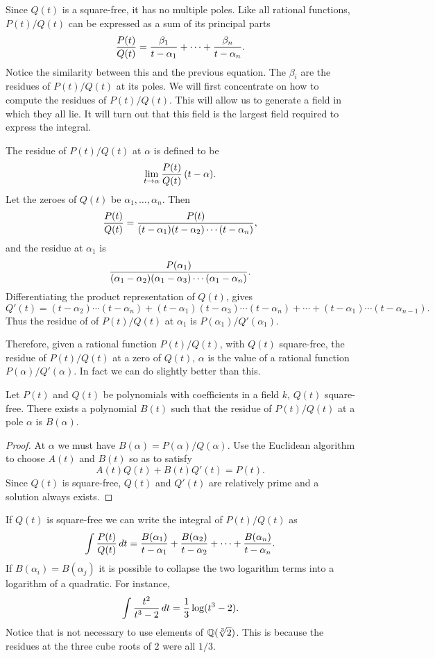 Since $Q(t)$ is a square-free, it has no multiple poles.  Like all rational
functions, $P(t)/Q(t)$ can be expressed as a sum of its principal parts
\[
{P(t) \over Q(t)} =
{\beta_1 \over t - \alpha_1} + \cdots + {\beta_n \over t - \alpha_n}.
\]
Notice the similarity between this and the previous equation.  The
$\beta_i$ are the residues of $P(t)/Q(t)$ at its poles.  We will first
concentrate on how to compute the residues of $P(t)/Q(t)$.  This will allow
us to generate a field in which they all lie.  It will turn out that this
field is the largest field required to express the integral.

The residue of $P(t)/Q(t)$ at $\alpha$ is defined to be
\[
\lim_{t \rightarrow \alpha} {P(t) \over Q(t)}\,(t - \alpha).
\]
Let the zeroes of $Q(t)$ be $\alpha_1, \ldots, \alpha_n$.  Then 
\[
{P(t) \over Q(t)} =
{P(t) \over (t - \alpha_1) (t - \alpha_2) \cdots (t - \alpha_n)},
\]
and the residue at $\alpha_1$ is
\[
{P(\alpha_1) \over (\alpha_1 - \alpha_2) (\alpha_1 - \alpha_3)
\cdots (\alpha_1 - \alpha_n)}.
\]
Differentiating the product representation of $Q(t)$, gives
\[
Q'(t) = (t - \alpha_2) \cdots (t - \alpha_n) +
(t - \alpha_1) (t - \alpha_3) \cdots (t - \alpha_n) + \cdots +
(t - \alpha_1) \cdots (t - \alpha_{n-1}).
\]
Thus the residue of of $P(t)/Q(t)$ at $\alpha_1$ is 
$P(\alpha_1)/Q'(\alpha_1)$.  

Therefore, given a rational function $P(t)/Q(t)$, with $Q(t)$ square-free,
the residue of $P(t)/Q(t)$ at a zero of $Q(t)$, $\alpha$ is the value of a
rational function $P(\alpha)/Q'(\alpha)$.  In fact we can do
slightly better than this.

\begin{proposition}
Let $P(t)$ and $Q(t)$ be polynomials with coefficients in a field $k$,
$Q(t)$ square-free.  There exists a polynomial $B(t)$ such that the
residue of $P(t)/Q(t)$ at a pole $\alpha$ is $B(\alpha)$.
\end{proposition}

\begin{proof}
At $\alpha$ we must have $B(\alpha) = P(\alpha) / Q(\alpha)$.  Use the
Euclidean algorithm to choose $A(t)$ and $B(t)$ so as to satisfy
\[
A(t) Q(t) + B(t) Q'(t) = P(t).
\]
Since $Q(t)$ is square-free, $Q(t)$ and $Q'(t)$ are relatively
prime and a solution always exists.
\end{proof}

If $Q(t)$ is square-free we can write the integral of $P(t)/Q(t)$ as
\[
\int {P(t) \over Q(t)} \,dt = {B(\alpha_1) \over t - \alpha_1}  +
{B(\alpha_2) \over t - \alpha_2} + \cdots +
{B(\alpha_n) \over t - \alpha_n}.
\]
If $B(\alpha_i) = B(\alpha_j)$ it is possible to collapse the two
logarithm terms into a logarithm of a quadratic.  For instance,
\[
\int {t^2 \over t^3 - 2} \, dt = {1 \over 3} \log (t^3 -2).
\]
Notice that is not necessary to use elements of $\Q(\root 3 \of{2})$.  This is
because the residues at the three cube roots of $2$ were all $1/3$.

